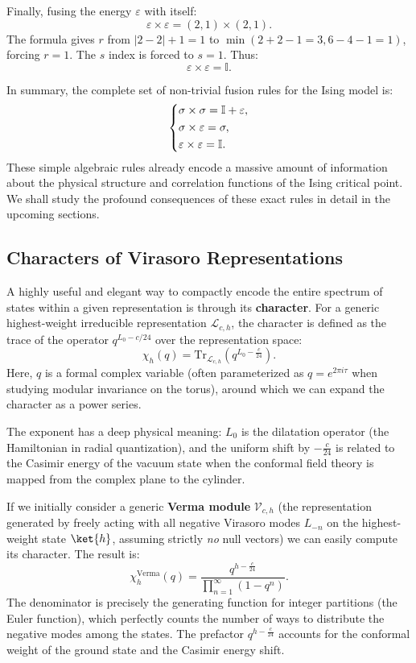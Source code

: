 Finally, fusing the energy \(\varepsilon\) with itself:
\[
    \varepsilon \times \varepsilon = (2,1) \times (2,1).
\]
The formula gives \(r\) from \(|2-2|+1=1\) to \(\min(2+2-1=3, 6-4-1=1)\), forcing \(r=1\). The \(s\) index is forced to \(s=1\). Thus:
\[
    \varepsilon \times \varepsilon = \mathbb{I}.
\]

In summary, the complete set of non-trivial fusion rules for the Ising model is:
\[
    \begin{dcases}
        \sigma \times \sigma           = \mathbb{I} + \varepsilon, \\
        \sigma \times \varepsilon      = \sigma,                   \\
        \varepsilon \times \varepsilon = \mathbb{I}.
    \end{dcases}
\]
These simple algebraic rules already encode a massive amount of information about the physical structure and correlation functions of the Ising critical point. We shall study the profound consequences of these exact rules in detail in the upcoming sections.

\subsection{Characters of Virasoro Representations}

A highly useful and elegant way to compactly encode the entire spectrum of states within a given representation is through its \textbf{character}. For a generic highest-weight irreducible representation \(\mathcal{L}_{c,h}\), the character is defined as the trace of the operator \(q^{L_0 - c/24}\) over the representation space:
\[
    \chi_h(q) = \text{Tr}_{\mathcal{L}_{c,h}} \left( q^{L_0 - \frac{c}{24}} \right).
\]
Here, \(q\) is a formal complex variable (often parameterized as \(q = e^{2\pi i \tau}\) when studying modular invariance on the torus), around which we can expand the character as a power series.

The exponent has a deep physical meaning: \(L_0\) is the dilatation operator (the Hamiltonian in radial quantization), and the uniform shift by \(-\frac{c}{24}\) is related to the Casimir energy of the vacuum state when the conformal field theory is mapped from the complex plane to the cylinder.

If we initially consider a generic \textbf{Verma module} \(\mathcal{V}_{c,h}\) (the representation generated by freely acting with all negative Virasoro modes \(L_{-n}\) on the highest-weight state \(\ket{h}\), assuming strictly \textit{no} null vectors) we can easily compute its character. The result is:
\[
    \chi^\mathrm{Verma}_h(q) = \frac{q^{h - \frac{c}{24}}}{\prod_{n=1}^\infty (1 - q^n)}.
\]
The denominator is precisely the generating function for integer partitions (the Euler function), which perfectly counts the number of ways to distribute the negative modes among the states. The prefactor \(q^{h - \frac{c}{24}}\) accounts for the conformal weight of the ground state and the Casimir energy shift.

